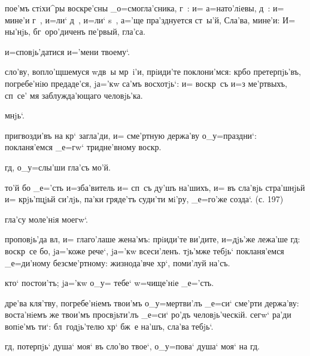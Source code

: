 
пое'мъ стiхи^ры воскре'сны _о=смогла'сника, г~: и= 
а=нато'лiевы, д~: и= мине'и г~, и=ли` д~, и=ли` s~, а='ще 
пра'зднуется ст~ы'й, Сла'ва, мине'и: И= ны'нjь, 
бг~оро'диченъ пе'рвый, гла'са.%


и=сповjь'датися и='мени твоему`.

сло'ву, вопло'щшемуся w\т дв~ы мр~i'и, прiиди'те 
поклони'мся: кр бо претерпjь'въ, погребе'нiю 
предаде'ся, jа='кw са'мъ восхотjь`: и= воскр~съ и=з\ъ 
ме'ртвыхъ, сп~се' мя заблужда'ющаго человjь'ка.

мнjь`.

пригвозди'въ на кр` загла'ди, и= сме'ртную держа'ву 
о_у=праздни`: покланя'емся _е=гw` тридне'вному 
воскр.

гд, о_у=слы'ши гла'съ мо'й.

то'й бо _е='сть и=зба'витель и= сп~съ ду'шъ на'шихъ, и= 
въ сла'вjь стра'шнjьй и= крjь'пцjьй си'лjь, па'ки 
гряде'тъ суди'ти мi'ру, _е=го'же созда`. (с. 197)


гла'су моле'нiя моегw`.

проповjь'да вл, и= глаго'лаше жена'мъ: прiиди'те 
ви'дите, и=дjь'же лежа'ше гд: воскр~се бо, jа='коже 
рече`, jа='кw всеси'ленъ. тjь'мже тебjь` покланя'емся 
_е=ди'ному безсме'ртному: жизнода'вче хр`, поми'луй 
на'съ.

кто` постои'тъ; jа='кw о_у= тебе` w=чище'нiе _е='сть.

дре'ва кля'тву, погребе'нiемъ твои'мъ о_у=мертви'лъ 
_е=си` сме'рти держа'ву: воста'нiемъ же твои'мъ 
просвjьти'лъ _е=си` ро'дъ человjь'ческiй. сегw` ра'ди 
вопiе'мъ ти`: бл~годjь'телю хр` бж~е на'шъ, сла'ва 
тебjь`.

гд, потерпjь` душа` моя` въ сло'во твое`, о_у=пова` 
душа` моя` на гд.

